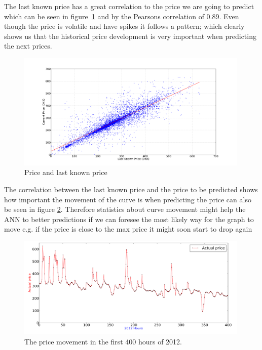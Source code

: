 The last known price has a great correlation to the price we are going to predict which can be seen in figure~\ref{fig:price_price} and by the Pearsons correlation of 0.89. Even though the price is volatile and have spikes it follows a pattern; which clearly shows us that the historical price development is very important when predicting the next prices.

\begin{figure}[H]
\centering
\includegraphics[width=0.99\textwidth]{billeder/priceVsLastKnownPrice.png}
\caption{Price and last known price}
\label{fig:price_price}
\end{figure}

The correlation between the last known price and the price to be predicted shows how important the movement of the curve is when predicting the price can also be seen in figure \ref{fig:priceGraphFirst400Hours}. Therefore statistics about curve movement might help the ANN to better predictions if we can foresee the most likely way for the graph to move e.g. if the price is close to the max price it might soon start to drop again 

\begin{figure}[H]
\centering
\includegraphics[width=0.99\textwidth]{billeder/priceGraph400.png}
\caption{The price movement in the first 400 hours of 2012.}
\label{fig:priceGraphFirst400Hours}
\end{figure}

